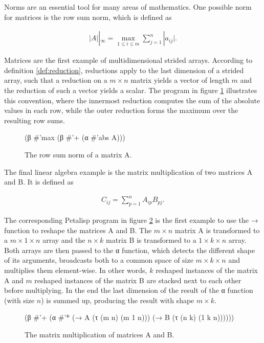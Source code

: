 Norms are an essential tool for many areas of mathematics. One possible
norm for matrices is the row sum norm, which is defined as

\begin{align}
|A||_\infty = \max_{1 \le i \le m} \sum_{j=1}^n |a_{ij}|.
\end{align}

Matrices are the first example of multidimensional strided
arrays. According to definition \ref{def:reduction}, reductions apply to
the last dimension of a strided array, such that a reduction on a
$m \times n$ matrix yields a vector of length $m$ and the reduction of such
a vector yields a scalar.  The program in figure \ref{fig:rowsumnorm}
illustrates this convention, where the innermost reduction computes the sum
of the absolute values in each row, while the outer reduction forms the
maximum over the resulting row sums.

\begin{figure}[h]
\resetlinenumber
\begin{code}
(β #'max (β #'+ (α #'abs A)))
\end{code}
\caption{The row sum norm of a matrix A.}
\label{fig:rowsumnorm}
\end{figure}

The final linear algebra example is the matrix multiplication of two
matrices A and B. It is defined as

\begin{align}
C_{ij} = \sum_{p=1}^{n} A_{ip} B_{pj}.
\end{align}

The corresponding Petalisp program in figure \ref{fig:matmul} is the first
example to use the → function to reshape the matrices A and B. The
$m \times n$ matrix A is transformed to a $m \times 1 \times n$ array and
the $n \times k$ matrix B is transformed to a $1 \times k \times n$
array. Both arrays are then passed to the α function, which detects the
different shape of its arguments, broadcasts both to a common space of size
$m \times k \times n$ and multiplies them element-wise. In other words, $k$
reshaped instances of the matrix A and $m$ reshaped instances of the matrix
B are stacked next to each other before multiplying. In the end the last
dimension of the result of the α function (with size $n$) is summed up,
producing the result with shape $m \times k$.

\begin{figure}[h]
\resetlinenumber
\begin{code}
(β #'+
   (α #'*
      (→ A (τ (m n) (m 1 n)))
      (→ B (τ (n k) (1 k n))))))
\end{code}
\caption{The matrix multiplication of matrices A and B.}
\label{fig:matmul}
\end{figure}

